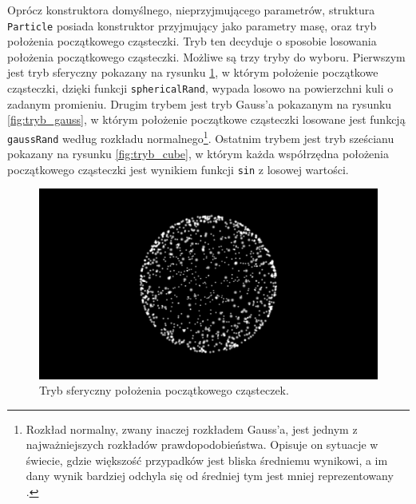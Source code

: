 \documentclass[12pt, twoside, openany]{report}
\begin{document}


Oprócz konstruktora domyślnego, nieprzyjmującego parametrów, struktura\\\texttt{Particle} posiada konstruktor przyjmujący jako parametry masę, oraz tryb położenia początkowego cząsteczki. Tryb ten decyduje o sposobie losowania położenia początkowego cząsteczki. Możliwe są trzy tryby do wyboru. Pierwszym jest tryb sferyczny pokazany na rysunku \ref{fig:tryb_sphere}, w którym położenie początkowe cząsteczki, dzięki funkcji \texttt{sphericalRand}, wypada losowo na powierzchni kuli o zadanym promieniu. Drugim trybem jest tryb Gauss’a pokazanym na rysunku \ref{fig:tryb_gauss}, w którym położenie początkowe cząsteczki losowane jest funkcją \texttt{gaussRand} według rozkładu normalnego\footnote{Rozkład normalny, zwany inaczej rozkładem Gauss’a, jest jednym z najważniejszych rozkładów prawdopodobieństwa. Opisuje on sytuacje w świecie, gdzie większość przypadków jest bliska średniemu wynikowi, a im dany wynik bardziej odchyla się od średniej tym jest mniej reprezentowany \cite{bib:rozklad_normalny}. }. Ostatnim trybem jest tryb sześcianu pokazany na rysunku \ref{fig:tryb_cube}, w którym każda współrzędna położenia początkowego cząsteczki jest wynikiem funkcji \texttt{sin} z losowej wartości.

\begin{figure}[H]
\centering
\includegraphics[width=\textwidth]{sphere.png}
\caption{Tryb sferyczny położenia początkowego cząsteczek.}
\label{fig:tryb_sphere}
\end{figure}
\end{document}
